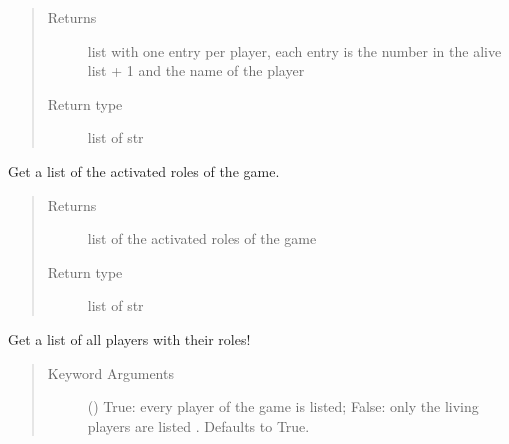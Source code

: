\documentclass[letterpaper,10pt,english]{sphinxmanual}
\begin{document}
\begin{fulllineitems}
\begin{fulllineitems}
\begin{quote}
\begin{description}
\item[{Returns}] \leavevmode
list with one entry per player, each entry is the number in the alive list + 1 and the name of the player

\item[{Return type}] \leavevmode
list of str

\end{description}\end{quote}

\end{fulllineitems}


\begin{fulllineitems}
\label{\detokenize{chatwolf:chatwolf.game.Game.get_num_roles}}
Get a list of the activated roles of the game.
\begin{quote}\begin{description}
\item[{Returns}] \leavevmode
list of the activated roles of the game

\item[{Return type}] \leavevmode
list of str

\end{description}\end{quote}

\end{fulllineitems}


\begin{fulllineitems}
\label{\detokenize{chatwolf:chatwolf.game.Game.get_players_role}}
Get a list of all players with their roles!
\begin{quote}\begin{description}
\item[{Keyword Arguments}] \leavevmode
{} (\sphinxstyleliteralemphasis{\sphinxupquote{, }}) \textendash{} True: every player of the game is listed; False: only the living players are listed . Defaults to True.


\end{description}
\end{quote}
\end{fulllineitems}
\end{fulllineitems}
\end{document}
